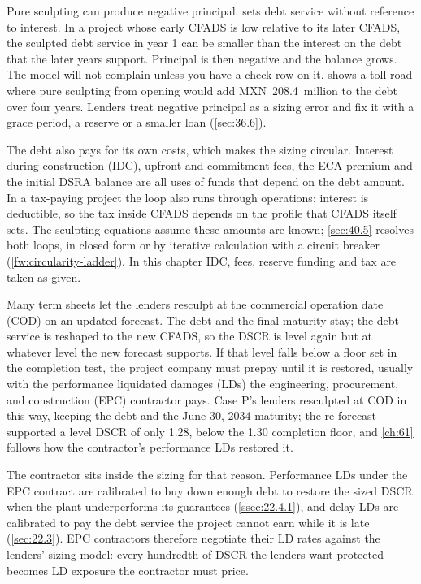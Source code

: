 Pure sculpting can produce negative principal.  sets debt service without reference to interest. In a project whose early CFADS is low relative to its later CFADS, the sculpted debt service in year 1 can be smaller than the interest on the debt that the later years support. Principal is then negative and the balance grows. The model will not complain unless you have a check row on it.  shows a toll road where pure sculpting from opening would add MXN~208.4~million to the debt over four years. Lenders treat negative principal as a sizing error and fix it with a grace period, a reserve or a smaller loan (\cref{sec:36.6}).

The debt also pays for its own costs, which makes the sizing circular. Interest during construction (IDC), upfront and commitment fees, the ECA premium and the initial DSRA balance are all uses of funds that depend on the debt amount. In a tax-paying project the loop also runs through operations: interest is deductible, so the tax inside CFADS depends on the profile that CFADS itself sets. The sculpting equations assume these amounts are known; \cref{sec:40.5} resolves both loops, in closed form or by iterative calculation with a circuit breaker (\cref{fw:circularity-ladder}). In this chapter IDC, fees, reserve funding and tax are taken as given.

Many term sheets let the lenders resculpt at the commercial operation date (COD) on an updated forecast. The debt and the final maturity stay; the debt service is reshaped to the new CFADS, so the DSCR is level again but at whatever level the new forecast supports. If that level falls below a floor set in the completion test, the project company must prepay until it is restored, usually with the performance liquidated damages (LDs) the engineering, procurement, and construction (EPC) contractor pays. Case P's lenders resculpted at COD in this way, keeping the debt and the June 30, 2034 maturity; the re-forecast supported a level DSCR of only 1.28\x, below the 1.30\x{} completion floor, and \cref{ch:61} follows how the contractor's performance LDs restored it. %

The contractor sits inside the sizing for that reason. Performance LDs under the EPC contract are calibrated to buy down enough debt to restore the sized DSCR when the plant underperforms its guarantees (\cref{ssec:22.4.1}), and delay LDs are calibrated to pay the debt service the project cannot earn while it is late (\cref{sec:22.3}). EPC contractors therefore negotiate their LD rates against the lenders' sizing model: every hundredth of DSCR the lenders want protected becomes LD exposure the contractor must price.

